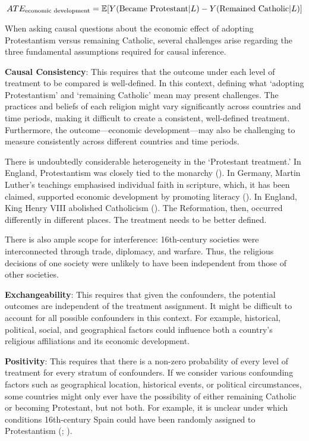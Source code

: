 \documentclass[
  single column]{article}
\begin{document}
\[
ATE_{\textnormal{economic~development}} = \mathbb{E}[Y(\textnormal{Became~Protestant}|L) - Y(\textnormal{Remained~Catholic}|L)]
\]

When asking causal questions about the economic effect of adopting
Protestantism versus remaining Catholic, several challenges arise
regarding the three fundamental assumptions required for causal
inference.

\textbf{Causal Consistency}: This requires that the outcome under each
level of treatment to be compared is well-defined. In this context,
defining what `adopting Protestantism' and `remaining Catholic' mean may
present challenges. The practices and beliefs of each religion might
vary significantly across countries and time periods, making it
difficult to create a consistent, well-defined treatment. Furthermore,
the outcome---economic development---may also be challenging to measure
consistently across different countries and time periods.

There is undoubtedly considerable heterogeneity in the `Protestant
treatment.' In England, Protestantism was closely tied to the monarchy
(). In Germany, Martin
Luther's teachings emphasised individual faith in scripture, which, it
has been claimed, supported economic development by promoting literacy
(). In England,
King Henry VIII abolished Catholicism
(). The Reformation, then,
occurred differently in different places. The treatment needs to be
better defined.

There is also ample scope for interference: 16th-century societies were
interconnected through trade, diplomacy, and warfare. Thus, the
religious decisions of one society were unlikely to have been
independent from those of other societies.

\textbf{Exchangeability}: This requires that given the confounders, the
potential outcomes are independent of the treatment assignment. It might
be difficult to account for all possible confounders in this context.
For example, historical, political, social, and geographical factors
could influence both a country's religious affiliations and its economic
development.

\textbf{Positivity}: This requires that there is a non-zero probability
of every level of treatment for every stratum of confounders. If we
consider various confounding factors such as geographical location,
historical events, or political circumstances, some countries might only
ever have the possibility of either remaining Catholic or becoming
Protestant, but not both. For example, it is unclear under which
conditions 16th-century Spain could have been randomly assigned to
Protestantism (;
).
\end{document}
